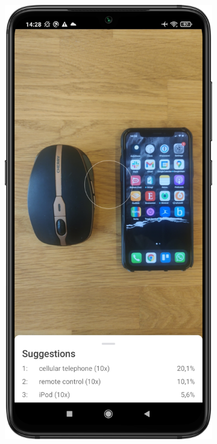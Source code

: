 \documentclass[
			   fontsize=11pt,
               paper=a4,
               bibliography=totoc,
               idxtotoc,
               headsepline,
               footsepline,
               footinclude=false,
               BCOR=12mm,
               DIV=13,
               openany,   %
               oneside    %
               ]
               {scrbook}
\begin{document}
\begin{figure}[H]
	\centering
	\begin{subfigure}{.23\textwidth}
		\centering
		\includegraphics[width=\linewidth]{figures/app_class_old.png}

\end{subfigure}
\end{figure}
\end{document}
